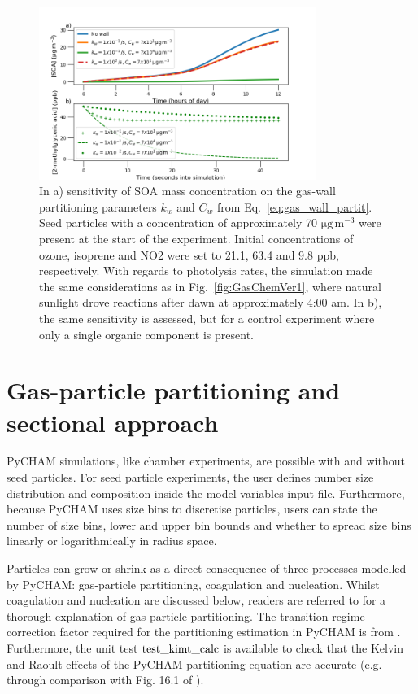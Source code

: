 \documentclass[gmd, manuscript]{copernicus}
\begin{document}
\begin{figure}[t]
\includegraphics[width=9.0cm]{Results/Gaswall_sens_fig.png}
\caption{In a) sensitivity of SOA mass concentration on the gas-wall partitioning parameters $k_{w}$ and $C_{w}$ from Eq.~\ref{eq:gas_wall_partit}.  Seed particles with a concentration of approximately 70 $\mathrm{\mu g\, m^{-3}}$ were present at the start of the experiment.  Initial concentrations of ozone, isoprene and NO2 were set to 21.1, 63.4 and 9.8 ppb, respectively.  With regards to photolysis rates, the simulation made the same considerations as in Fig.~\ref{fig:GasChemVer1}, where natural sunlight drove reactions after dawn at approximately 4:00 am.  In b), the same sensitivity is assessed, but for a control experiment where only a single organic component is present.}
\label{fig:Gaswall_sens_fig}
\end{figure}

\section{Gas-particle partitioning and sectional approach}\label{sec:gp_part}

PyCHAM simulations, like chamber experiments, are possible with and without seed particles.  For seed particle experiments, the user defines number size distribution and composition inside the model variables input file.  Furthermore, because PyCHAM uses size bins to discretise particles, users can state the number of size bins, lower and upper bin bounds and whether to spread size bins linearly or logarithmically in radius space.  

Particles can grow or shrink as a direct consequence of three processes modelled by PyCHAM: gas-particle partitioning, coagulation and nucleation.  Whilst coagulation and nucleation are discussed below, readers are referred to \citet{Zaveri2008} for a thorough explanation of gas-particle partitioning.  The transition regime correction factor required for the partitioning estimation in PyCHAM is from \citet{Fuchs1971}.  Furthermore, the unit test $\rm{test\_kimt\_calc}$ is available to check that the Kelvin and Raoult effects of the PyCHAM partitioning equation are accurate (e.g. through comparison with Fig. 16.1 of \citet{Jacobson2005}).
\end{document}
